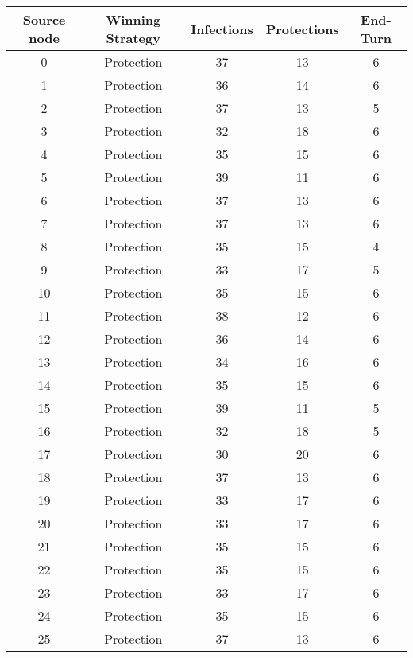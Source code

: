 \documentclass[results.tex]{subfiles}
\begin{document}
\begin{center}
  \begin{tabular}{| c || c | c | c | c |}
    \hline
    {\bfseries Source node} & {\bfseries Winning Strategy} & {\bfseries Infections} & {\bfseries Protections} & {\bfseries End-Turn} \\  %
    \hline\hline
    0 & Protection & 37 & 13 & 6 \\ 
    \hline
    1 & Protection & 36 & 14 & 6 \\ 
    \hline
    2 & Protection & 37 & 13 & 5 \\ 
    \hline
    3 & Protection & 32 & 18 & 6 \\ 
    \hline
    4 & Protection & 35 & 15 & 6 \\ 
    \hline
    5 & Protection & 39 & 11 & 6 \\ 
    \hline
    6 & Protection & 37 & 13 & 6 \\ 
    \hline
    7 & Protection & 37 & 13 & 6 \\ 
    \hline
    8 & Protection & 35 & 15 & 4 \\ 
    \hline
    9 & Protection & 33 & 17 & 5 \\ 
    \hline
    10 & Protection & 35 & 15 & 6 \\ 
    \hline
    11 & Protection & 38 & 12 & 6 \\ 
    \hline
    12 & Protection & 36 & 14 & 6 \\ 
    \hline
    13 & Protection & 34 & 16 & 6 \\ 
    \hline
    14 & Protection & 35 & 15 & 6 \\ 
    \hline
    15 & Protection & 39 & 11 & 5 \\ 
    \hline
    16 & Protection & 32 & 18 & 5 \\ 
    \hline
    17 & Protection & 30 & 20 & 6 \\ 
    \hline
    18 & Protection & 37 & 13 & 6 \\ 
    \hline
    19 & Protection & 33 & 17 & 6 \\ 
    \hline
    20 & Protection & 33 & 17 & 6 \\ 
    \hline
    21 & Protection & 35 & 15 & 6 \\ 
    \hline
    22 & Protection & 35 & 15 & 6 \\ 
    \hline
    23 & Protection & 33 & 17 & 6 \\ 
    \hline
    24 & Protection & 35 & 15 & 6 \\ 
    \hline
    25 & Protection & 37 & 13 & 6 \\ 

\end{tabular}
\end{center}
\end{document}
